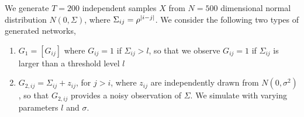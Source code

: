         We generate \(T = 200\) independent samples \(X\) from \(N = 500\) dimensional normal distribution \(N(0, \Sigma)\), where \(\Sigma_{ij} = \rho^{\abs{i-j}}\). We consider the following two types of generated networks, 
        \begin{enumerate}
            \item 
        \(G_{1} = [G_{ij}]\) where \(G_{ij} = 1\) if \(\Sigma_{ij} > l\), so that we observe \(G_{ij} = 1\) if \(\Sigma_{ij}\) is larger than a threshold level \(l\) 
        \item \(G_{2,ij} = \Sigma_{ij} + z_{ij}\), for \(j>i\), where \(z_{ij}\) are independently drawn from \(N(0, \sigma^{2})\), so that \(G_{2,ij}\) provides a noisy observation of \(\Sigma\). We simulate with varying parameters \(l\) and \(\sigma\). 
        \end{enumerate}

